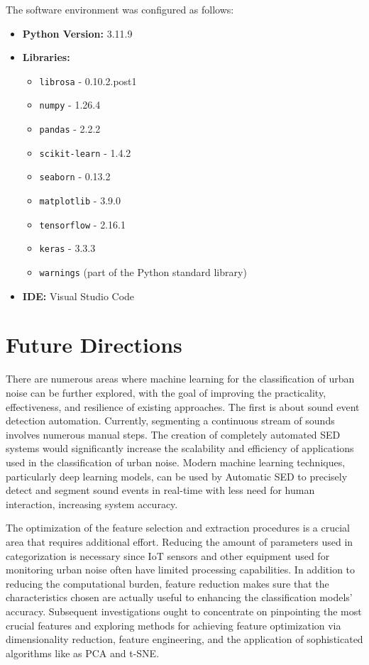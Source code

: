 \documentclass[conference]{IEEEtran}
\begin{document}
The software environment was configured as follows:
\begin{itemize}
    \item \textbf{Python Version:} 3.11.9
    \item \textbf{Libraries:}
    \begin{itemize}
        \item \texttt{librosa} - 0.10.2.post1
        \item \texttt{numpy} - 1.26.4
        \item \texttt{pandas} - 2.2.2
        \item \texttt{scikit-learn} - 1.4.2
        \item \texttt{seaborn} - 0.13.2
        \item \texttt{matplotlib} - 3.9.0
        \item \texttt{tensorflow} - 2.16.1
        \item \texttt{keras} - 3.3.3
        \item \texttt{warnings} (part of the Python standard library)
    \end{itemize}
    \item \textbf{IDE:} Visual Studio Code
\end{itemize}


\section{Future Directions}
There are numerous areas where machine learning for the classification of urban noise can be further explored, with the goal of improving the practicality, effectiveness, and resilience of existing approaches. The first is about sound event detection automation. Currently, segmenting a continuous stream of sounds involves numerous manual steps. The creation of completely automated SED systems would significantly increase the scalability and efficiency of applications used in the classification of urban noise.\cite{tsalera2020monitoring}\cite{kim2021data} Modern machine learning techniques, particularly deep learning models, can be used by Automatic SED to precisely detect and segment sound events in real-time with less need for human interaction, increasing system accuracy.

The optimization of the feature selection and extraction procedures is a crucial area that requires additional effort. Reducing the amount of parameters used in categorization is necessary since IoT sensors and other equipment used for monitoring urban noise often have limited processing capabilities.\cite{8300941}\cite{alsouda2018machine}  In addition to reducing the computational burden, feature reduction makes sure that the characteristics chosen are actually useful to enhancing the classification models' accuracy. Subsequent investigations ought to concentrate on pinpointing the most crucial features and exploring methods for achieving feature optimization via dimensionality reduction, feature engineering, and the application of sophisticated algorithms like as PCA and t-SNE.\cite{8300941}
\end{document}
